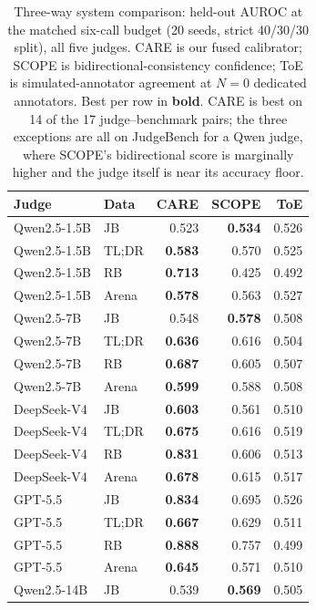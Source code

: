 \begin{table}[h]
\centering
\small
\setlength{\tabcolsep}{3.5pt}
\caption{Three-way system comparison: held-out AUROC at the matched six-call budget (20 seeds, strict 40/30/30 split), all five judges. CARE is our fused calibrator; SCOPE is bidirectional-consistency confidence; ToE is simulated-annotator agreement at $N{=}0$ dedicated annotators. Best per row in \textbf{bold}. CARE is best on 14 of the 17 judge--benchmark pairs; the three exceptions are all on JudgeBench for a Qwen judge, where SCOPE's bidirectional score is marginally higher and the judge itself is near its accuracy floor.}
\label{tab:threeway}
\begin{tabular}{llrrr}
\toprule
Judge & Data & \textbf{CARE} & SCOPE & ToE \\
\midrule
Qwen2.5-1.5B & JB & 0.523 & \textbf{0.534} & 0.526 \\
Qwen2.5-1.5B & TL;DR & \textbf{0.583} & 0.570 & 0.525 \\
Qwen2.5-1.5B & RB & \textbf{0.713} & 0.425 & 0.492 \\
Qwen2.5-1.5B & Arena & \textbf{0.578} & 0.563 & 0.527 \\
\midrule
Qwen2.5-7B & JB & 0.548 & \textbf{0.578} & 0.508 \\
Qwen2.5-7B & TL;DR & \textbf{0.636} & 0.616 & 0.504 \\
Qwen2.5-7B & RB & \textbf{0.687} & 0.605 & 0.507 \\
Qwen2.5-7B & Arena & \textbf{0.599} & 0.588 & 0.508 \\
\midrule
DeepSeek-V4 & JB & \textbf{0.603} & 0.561 & 0.510 \\
DeepSeek-V4 & TL;DR & \textbf{0.675} & 0.616 & 0.519 \\
DeepSeek-V4 & RB & \textbf{0.831} & 0.606 & 0.513 \\
DeepSeek-V4 & Arena & \textbf{0.678} & 0.615 & 0.517 \\
\midrule
GPT-5.5 & JB & \textbf{0.834} & 0.695 & 0.526 \\
GPT-5.5 & TL;DR & \textbf{0.667} & 0.629 & 0.511 \\
GPT-5.5 & RB & \textbf{0.888} & 0.757 & 0.499 \\
GPT-5.5 & Arena & \textbf{0.645} & 0.571 & 0.510 \\
\midrule
Qwen2.5-14B & JB & 0.539 & \textbf{0.569} & 0.505 \\
\bottomrule
\end{tabular}
\end{table}

